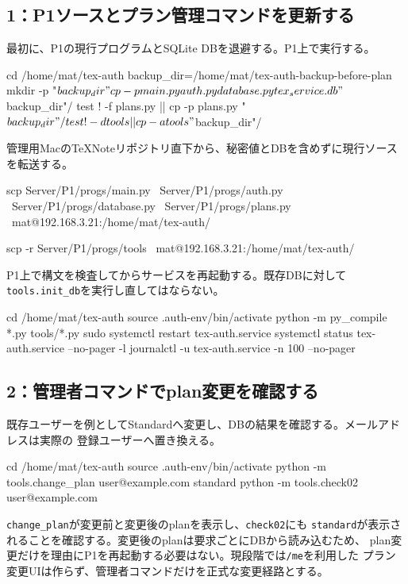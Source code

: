 \documentclass[uplatex,a4paper,11pt]{jsarticle}
\begin{document}
\subsection{1：P1ソースとプラン管理コマンドを更新する}

最初に、P1の現行プログラムとSQLite DBを退避する。P1上で実行する。

\begin{command}
cd /home/mat/tex-auth
backup_dir=/home/mat/tex-auth-backup-before-plan
mkdir -p "$backup_dir"
cp -p main.py auth.py database.py tex_service.db "$backup_dir"/
test ! -f plans.py || cp -p plans.py "$backup_dir"/
test ! -d tools || cp -a tools "$backup_dir"/
\end{command}

管理用MacのTeXNoteリポジトリ直下から、秘密値とDBを含めずに現行ソースを転送する。

\begin{command}
scp Server/P1/progs/main.py \
    Server/P1/progs/auth.py \
    Server/P1/progs/database.py \
    Server/P1/progs/plans.py \
    mat@192.168.3.21:/home/mat/tex-auth/

scp -r Server/P1/progs/tools \
    mat@192.168.3.21:/home/mat/tex-auth/
\end{command}

P1上で構文を検査してからサービスを再起動する。既存DBに対して
\texttt{tools.init\_db}を実行し直してはならない。

\begin{command}
cd /home/mat/tex-auth
source .auth-env/bin/activate
python -m py_compile *.py tools/*.py
sudo systemctl restart tex-auth.service
systemctl status tex-auth.service --no-pager -l
journalctl -u tex-auth.service -n 100 --no-pager
\end{command}

\subsection{2：管理者コマンドでplan変更を確認する}

既存ユーザーを例としてStandardへ変更し、DBの結果を確認する。メールアドレスは実際の
登録ユーザーへ置き換える。

\begin{command}
cd /home/mat/tex-auth
source .auth-env/bin/activate
python -m tools.change_plan user@example.com standard
python -m tools.check02 user@example.com
\end{command}

\texttt{change\_plan}が変更前と変更後のplanを表示し、\texttt{check02}にも
\texttt{standard}が表示されることを確認する。変更後のplanは要求ごとにDBから読み込むため、
plan変更だけを理由にP1を再起動する必要はない。現段階では\texttt{/me}を利用した
プラン変更UIは作らず、管理者コマンドだけを正式な変更経路とする。
\end{document}

